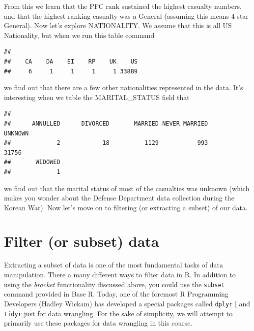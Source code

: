 \documentclass[]{book}
\newenvironment{Shaded}{\begin{snugshade}}{\end{snugshade}}
\newcommand{\KeywordTok}[1]{\textcolor[rgb]{0.13,0.29,0.53}{\textbf{{#1}}}}
\newcommand{\NormalTok}[1]{{#1}}
\begin{document}
From this we learn that the PFC rank sustained the highest casualty
numbers, and that the highest ranking casualty was a General (assuming
this means 4-star General). Now let's explore NATIONALITY. We assume
that this is all US Nationality, but when we run this table command

\begin{Shaded}
\end{Shaded}

\begin{verbatim}
## 
##    CA    DA    EI    RP    UK    US 
##     6     1     1     1     1 33889
\end{verbatim}

we find out that there are a few other nationalities represented in the
data. It's interesting when we table the MARITAL\_STATUS field that

\begin{Shaded}
\end{Shaded}

\begin{verbatim}
## 
##      ANNULLED      DIVORCED       MARRIED NEVER MARRIED       UNKNOWN 
##             2            18          1129           993         31756 
##       WIDOWED 
##             1
\end{verbatim}

we find out that the marital status of most of the casualties was
unknown (which makes you wonder about the Defense Department data
collection during the Korean War). Now let's move on to filtering (or
extracting a subset) of our data.

\section{Filter (or subset) data}\label{filter-or-subset-data}

Extracting a subset of data is one of the most fundamental tasks of data
manipulation. There a many different ways to filter data in R. In
addition to using the \emph{bracket} functionality discussed above, you
could use the \texttt{subset} command provided in Base R. Today, one of
the foremost R Programming Developers (Hadley Wickam) has developed a
special packages called \texttt{dplyr} {[}\citep{R-dplyr} and
\texttt{tidyr} \citep{R-tidyr} just for data wrangling. For the sake of
simplicity, we will attempt to primarily use these packages for data
wrangling in this course.
\end{document}
